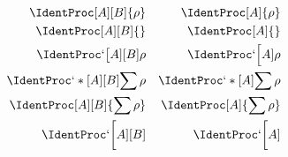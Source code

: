\documentclass{article}
\begin{document}
  \begin{align*}
    \IdentProc[A][B]{\rho}
    & &
      \IdentProc[A]{\rho}
    \\
      \IdentProc[A][B]{}
    &&
       \IdentProc[A]{}
    \\
    \IdentProc`\big[A][B]{\rho}
    &&
       \IdentProc`\Big[A]{\rho}
    \\
    \IdentProc`*[A][B]{\sum\rho}
    &&
    \IdentProc`*[A]{\sum\rho}
    \\
    \IdentProc[A][B]{\sum\rho}
    &&
    \IdentProc[A]{\sum\rho}
    \\
    \IdentProc`\bigg[A][B]{}
    &&
    \IdentProc`\bigg[A]{}
  \end{align*}
\end{document}
